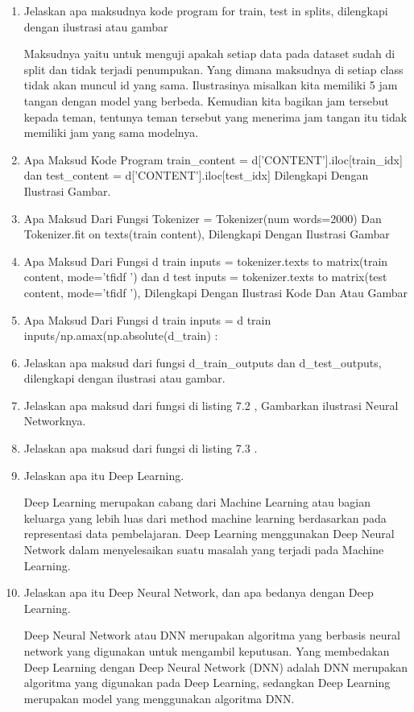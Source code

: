 \begin{enumerate}
\item Jelaskan apa maksudnya kode program for train, test in splits, dilengkapi dengan ilustrasi atau gambar
	\par Maksudnya yaitu untuk menguji apakah setiap data pada dataset sudah di split dan tidak terjadi penumpukan. Yang dimana maksudnya di setiap class tidak akan muncul id yang sama. Ilustrasinya misalkan kita memiliki 5 jam tangan dengan model yang berbeda. Kemudian kita bagikan jam tersebut kepada teman, tentunya teman tersebut yang menerima jam tangan itu tidak memiliki jam yang sama modelnya.
 

\item Apa Maksud Kode Program train\_content = d['CONTENT'].iloc[train\_idx] dan test\_content = d['CONTENT'].iloc[test\_idx] Dilengkapi Dengan Ilustrasi Gambar.

\item Apa Maksud Dari Fungsi Tokenizer = Tokenizer(num words=2000) Dan Tokenizer.fit on texts(train content), Dilengkapi Dengan Ilustrasi Gambar

\item  Apa Maksud Dari Fungsi d train inputs = tokenizer.texts to matrix(train content, mode=’tfidf ’) dan d test inputs = tokenizer.texts to matrix(test content, mode=’tfidf ’), Dilengkapi Dengan Ilustrasi Kode Dan Atau Gambar

\item Apa Maksud Dari Fungsi d train inputs = d train inputs/np.amax(np.absolute(d\_train) :

\item Jelaskan apa maksud dari fungsi d\_train\_outputs dan d\_test\_outputs, dilengkapi dengan ilustrasi atau gambar.

\item Jelaskan apa maksud dari fungsi di listing 7.2 , Gambarkan ilustrasi Neural Networknya.

\item Jelaskan apa maksud dari fungsi di listing 7.3 .

\item Jelaskan apa itu Deep Learning.
	\par Deep Learning merupakan cabang dari Machine Learning atau bagian keluarga yang lebih luas dari method machine learning berdasarkan pada representasi data pembelajaran. Deep Learning menggunakan Deep Neural Network dalam menyelesaikan suatu masalah yang terjadi pada Machine Learning.

\item Jelaskan apa itu Deep Neural Network, dan apa bedanya dengan Deep Learning.
	\par Deep Neural Network atau DNN merupakan algoritma yang berbasis neural network yang digunakan untuk mengambil keputusan. Yang membedakan Deep Learning dengan  Deep Neural Network (DNN) adalah DNN merupakan algoritma yang digunakan pada Deep Learning, sedangkan Deep Learning merupakan model yang menggunakan algoritma DNN.


\end{enumerate}
